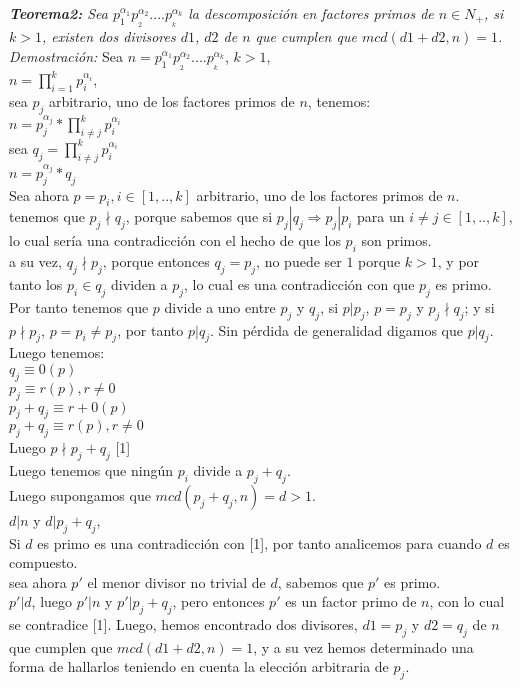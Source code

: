 \documentclass[12pt]{article}
\begin{document}
\textit{\textbf{Teorema2:} Sea $p_{1}^{\alpha_1}p_{_2}^{\alpha_2}....p_{_k}^{\alpha_k}$ la descomposici\'on en factores primos de $n\in N_+$,
 si $k>1$, existen dos divisores $d1$, $d2$ de $n$ que cumplen que $mcd(d1+d2,n)=1$.}\\
\textit{Demostraci\'on:} Sea $n = p_{1}^{\alpha_1}p_{_2}^{\alpha_2}....p_{_k}^{\alpha_k}$, $k>1$,\\
 $n = \prod\limits_{i=1}^{k} p_{i}^{\alpha_i} $, \\
sea $p_j$ arbitrario, uno de los factores primos de $n$, tenemos:\\
 $n = p_{j}^{\alpha_j}*\prod\limits_{i\neq j}^{k} p_{i}^{\alpha_i} $ \\
 sea $q_j =  \prod\limits_{i\neq j}^{k} p_{i}^{\alpha_i} $ \\
 $n = p_{j}^{\alpha_j}* q_j $ \\
 Sea ahora $p = p_i, i\in[1,..,k]$ arbitrario, uno de los factores primos de $n$.
 tenemos que $p_j \nmid  q_j$, porque sabemos que si $p_j| q_j \Rightarrow p_j| p_i$ para un $i\neq j \in [1,..,k]$, lo cual ser\'ia una 
contradicci\'on con el hecho de que los $p_i$ son primos.\\
 a su vez, $q_j \nmid p_j $, porque entonces $q_j = p_j$, no puede ser $1$ porque $k>1$, y por tanto los $p_i\in q_j$ dividen a $p_j$, lo cual es una contradicci\'on con que $p_j$ es primo.\\
 Por tanto tenemos que $p$ divide a uno entre $p_j$ y $q_j$, si $p|p_j$, $p = p_j$ y $p_j\nmid q_j$; y si 
 $p\nmid p_j$, $p=p_i\neq p_j$, por 
tanto $p| q_j$. Sin p\'erdida de generalidad digamos que $p|q_j$.\\
 Luego tenemos:\\
 $q_j\equiv 0(p)$\\
 $p_j\equiv r(p), r\neq 0$\\
 $p_j + q_j \equiv r + 0(p)$\\
 $p_j + q_j \equiv r(p), r\neq 0$\\
 Luego $p\nmid p_j + q_j$ [1]\\
 Luego tenemos que ning\'un $p_i$ divide a $p_j+q_j$.\\
 Luego supongamos que $mcd(p_j+q_j,n)= d > 1$. \\
 $d| n $ y $d| p_j + q_j$, \\
 Si $d$ es primo es una contradicci\'on con [1], por tanto analicemos para cuando $d$ es compuesto.\\
  sea ahora $p'$ el menor divisor no trivial de $d$, sabemos que $p'$ es primo.\\ 
 $p'|d $, luego $p'|n$ y $p' | p_j + q_j $, pero entonces $p'$ es un factor primo de $n$, con lo cual se contradice [1]. Luego, hemos encontrado dos divisores, $d1=p_j$ y $d2=q_j$ de $n$ que cumplen que $mcd(d1+d2,n)=1$, y a su vez hemos determinado una forma de hallarlos
teniendo en cuenta la elecci\'on arbitraria de $p_j$.\\
\end{document}
